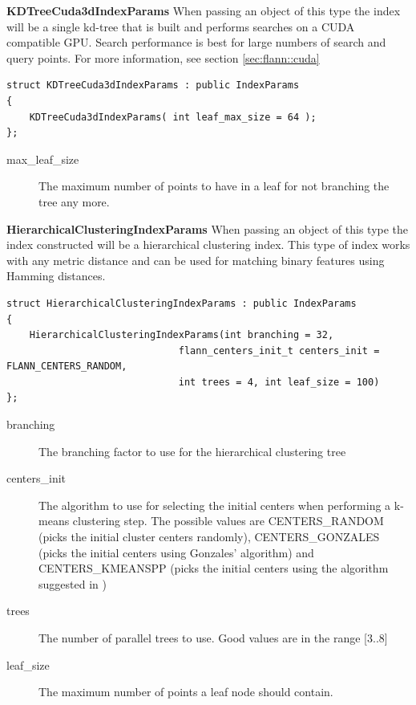 \documentclass[letter,10pt]{article}
\begin{document}
\begin{description}
\textbf{KDTreeCuda3dIndexParams} When passing an object of this type the index will be a single kd-tree that 
is built and performs searches on a CUDA compatible GPU. Search performance is best for large numbers of search and query points.
For more information, see section \ref{sec:flann::cuda}
\begin{Verbatim}[fontsize=\footnotesize]
struct KDTreeCuda3dIndexParams : public IndexParams
{
    KDTreeCuda3dIndexParams( int leaf_max_size = 64 );
};
\end{Verbatim}
\begin{description}
 \item[max\_leaf\_size] The maximum number of points to have in a leaf for not branching the tree any more.
\end{description}


\textbf{HierarchicalClusteringIndexParams} When passing an object of this type the index constructed will be a
hierarchical clustering index. This type of index works with any metric distance and can be used for matching 
binary features using Hamming distances.
\begin{Verbatim}[fontsize=\footnotesize]
struct HierarchicalClusteringIndexParams : public IndexParams
{
    HierarchicalClusteringIndexParams(int branching = 32,
                              flann_centers_init_t centers_init = FLANN_CENTERS_RANDOM,
                              int trees = 4, int leaf_size = 100)
};
\end{Verbatim}
\begin{description}
\item[branching]{ The branching factor to use for the hierarchical clustering tree }
\item[centers\_init]{ The algorithm to use for selecting the initial
                  centers when performing a k-means clustering step. The possible values are
                  CENTERS\_RANDOM (picks the initial cluster centers randomly), CENTERS\_GONZALES (picks the
                  initial centers using Gonzales' algorithm) and CENTERS\_KMEANSPP (picks the initial
                centers using the algorithm suggested in \cite{arthur_kmeanspp_2007}) }
\item[trees] The number of parallel trees to use. Good values are in the range [3..8]
\item[leaf\_size] The maximum number of points a leaf node should contain.
\end{description}



\end{description}
\end{document}
